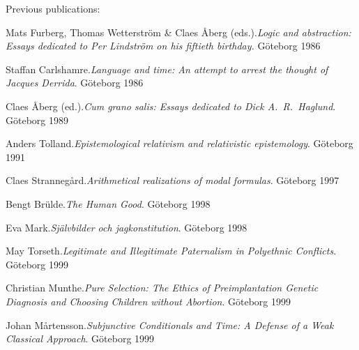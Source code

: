 \documentclass[fontsize=14pt,
               paper=297mm:210mm,
               twoside,
               pagesize=pdftex,
               DIV=calc
]{scrbook}
\begin{document}
\setlength\columnsep{20pt}
\begin{multicols*}{2}
\newenvironment{Volumes}
{\begin{list}{\arabic{volumes}. }{\usecounter{volumes}%
\setlength{\labelsep}{0pt}%
\setlength{\leftmargin}{0pt}%
\setlength{\labelwidth}{0pt}%
\setlength{\listparindent}{0pt}%
\setlength{\itemsep}{6pt}%
\setlength{\topsep}{0pt}%
\setlength{\parsep}{0pt}}}%
{\end{list}}
\noindent Previous publications:

\begin{Volumes}
\item Mats Furberg, Thomas Wetterstr\"om \& Claes \AA{}berg (eds.).\enspace\textit{Logic and abstraction: Essays dedicated to Per Lindstr\"om on his fiftieth birthday.} \mbox{G\"oteborg} 1986

\item Staffan Carlshamre.\enspace\textit{Language and time: An attempt to arrest the thought of Jacques Derrida}. \mbox{G\"oteborg} 1986

\item Claes \AA{}berg (ed.).\enspace\textit{Cum grano salis: Essays dedicated to Dick A.~R.~Haglund}. \mbox{G\"oteborg} 1989

\item Anders Tolland.\enspace\textit{Epistemological relativism and relativistic epistemology}. \mbox{G\"oteborg} 1991

\item Claes Stranneg\aa{}rd.\enspace\textit{Arithmetical realizations of modal formulas}. \mbox{G\"oteborg} 1997

\item Bengt Br\"ulde.\enspace\textit{The Human Good}. \mbox{G\"oteborg} 1998

\item Eva Mark.\enspace\textit{Sj\"alvbilder och jagkonstitution}. \mbox{G\"oteborg} 1998

\item May Torseth.\enspace\textit{Legitimate and Illegitimate Paternalism in Polyethnic Conflicts}. \mbox{G\"oteborg} 1999

\item Christian Munthe.\enspace\textit{Pure Selection: The Ethics of Preimplantation Genetic Diagnosis and Choosing Children without Abortion}. \mbox{G\"oteborg} 1999

\item Johan M\aa{}rtensson.\enspace\textit{Subjunctive Conditionals and Time: A Defense of a Weak Classical Approach}. \mbox{G\"oteborg} 1999


\end{Volumes}
\end{multicols*}
\end{document}
